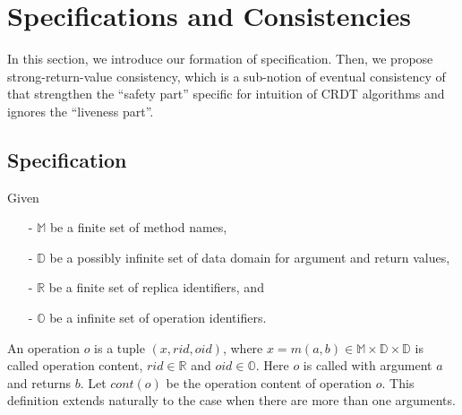 
\section{Specifications and Consistencies}
\label{sec:specifications and consistencies}

In this section, we introduce our formation of specification. Then, we propose strong-return-value consistency, which is a sub-notion of eventual consistency of \cite{Bouajjani:2014} that strengthen the ``safety part'' specific for intuition of CRDT algorithms and ignores the ``liveness part''. 


\subsection{Specification}
\label{subsec:specification}

Given

\begin{itemize}
\setlength{\itemsep}{0.5pt}
\item[-] $\mathbb{M}$ be a finite set of method names,

\item[-] $\mathbb{D}$ be a possibly infinite set of data domain for argument and return values,

\item[-] $\mathbb{R}$ be a finite set of replica identifiers, and

\item[-] $\mathbb{O}$ be a infinite set of operation identifiers.
\end{itemize}


An operation $o$ is a tuple $(x,rid,oid)$, where $x =  m(a,b) \in \mathbb{M} \times \mathbb{D} \times \mathbb{D}$ is called operation content, $rid \in \mathbb{R}$ and $oid \in \mathbb{O}$. Here $o$ is called with argument $a$ and returns $b$. Let $cont(o)$ be the operation content of operation $o$. This definition extends naturally to the case when there are more than one arguments.



